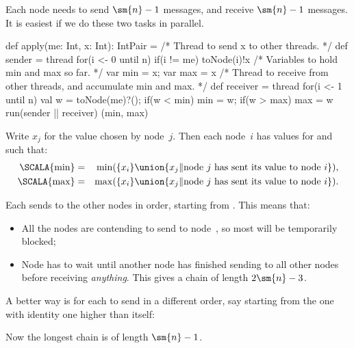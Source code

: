 \documentclass[notes,color]{sepslide0}
\def\set#1{\{#1\}}
\begin{document}
\begin{slide}

Each node needs to send $\sm{n}-1$ messages, and receive $\sm{n}-1$ messages.
It is easiest if we do these two tasks in parallel.
%
\begin{scala}
  def apply(me: Int, x: Int): IntPair = {
    /* Thread to send x to other threads. */
    def sender = thread{ for(i <- 0 until n) if(i != me) toNode(i)!x }
    /* Variables to hold min and max so far. */
    var min = x; var max = x
    /* Thread to receive from other threads, and accumulate min and max. */
    def receiver = thread{
      for(i <- 1 until n){
	val w = toNode(me)?(); if(w < min) min = w; if(w > max) max = w
      }
    }
    run(sender || receiver)
    (min, max)
  }
\end{scala}
\end{slide}



\begin{slide}

Write $x_j$ for the value chosen by node~$j$.  Then each node~$i$ has values
for  and  such that:
%
\begin{eqnarray*}
\mbox{\SCALA{min}} & = & 
  \min(\set{x_i} \union 
    \set{x_j \| \mbox{node~$j$ has sent its value to node~$i$}}), \\
\mbox{\SCALA{max}} & = & 
  \max(\set{x_i} \union 
    \set{x_j \| \mbox{node~$j$ has sent its value to node~$i$}}).
\end{eqnarray*}
\end{slide}


\begin{slide}

Each  sends to the other nodes in order, starting from
.  This means that:
%
\begin{itemize}
\item
All the nodes are contending to send to node~, so most will be
temporarily blocked;

\item
Node  has to wait until another node has finished sending to all
other nodes before receiving \emph{anything}.  This gives a chain of length
$2\sm{n}-3$.
\end{itemize}
 
A better way is for each  to send in a different order, say
starting from the one with identity one higher than itself:
%
Now the longest chain is of length $\sm{n}-1$. 
\end{slide}
\end{document}
